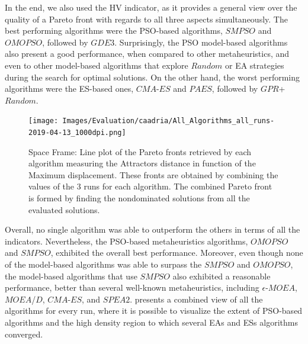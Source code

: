 In the end, we also used the \ac{HV} indicator, as it provides a general view over the quality of a Pareto front with regards to all three aspects simultaneously. The best performing algorithms were the \ac{PSO}-based algorithms, $SMPSO$ and $OMOPSO$, followed by $GDE3$. Surprisingly, the \ac{PSO} model-based algorithms also present a good performance, when compared to other metaheuristics, and even to other model-based algorithms that explore $Random$ or \ac{EA} strategies during the search for optimal solutions. On the other hand, the worst performing algorithms were the \ac{ES}-based ones, $CMA$-$ES$ and $PAES$, followed by $GPR$+$Random$. %

\begin{figure}[htbp]
	\centering
	\texttt{[image: Images/Evaluation/caadria/All\_Algorithms\_all\_runs-2019-04-13\_1000dpi.png]}
	\caption[Space Frame: Pareto front plot]{Space Frame: Line plot of the Pareto fronts retrieved by each algorithm measuring the Attractors distance in function of the Maximum displacement. These fronts are obtained by combining the values of the $3$ runs for each algorithm. The combined Pareto front is formed by finding the nondominated solutions from all the evaluated solutions.}
	\label{fig:allruns}
\end{figure}

Overall, no single algorithm was able to outperform the others in terms of all the indicators. Nevertheless, the \ac{PSO}-based metaheuristics algorithms, $OMOPSO$ and $SMPSO$, exhibited the overall best performance. Moreover, even though none of the model-based algorithms was able to surpass the $SMPSO$ and $OMOPSO$, the model-based algorithms that use $SMPSO$ also exhibited a reasonable performance, better than several well-known metaheuristics, including $\epsilon$-$MOEA$, $MOEA$/$D$, $CMA$-$ES$, and $SPEA2$.  presents a combined view of all the algorithms for every run, where it is possible to visualize the extent of \ac{PSO}-based algorithms and the high density region to which several \acp{EA} and \acp{ES} algorithms converged.


